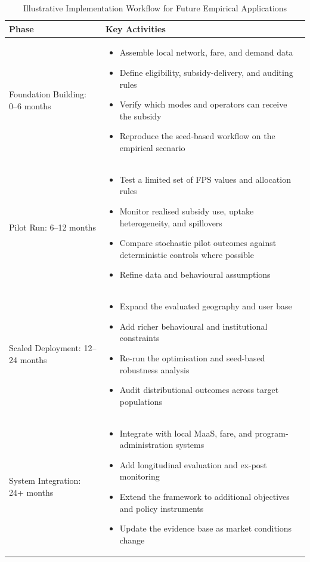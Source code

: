\documentclass[a4paper,fleqn]{cas-sc}
\begin{document}
\begin{table}[htbp]
\centering
\caption{Illustrative Implementation Workflow for Future Empirical Applications}
\label{tab:implementation_framework}
\begin{tabular}{p{2.5cm}p{12cm}}
\toprule
\textbf{Phase} & \textbf{Key Activities} \\
\midrule
Foundation Building: 0--6 months & 
\begin{itemize}
    \item Assemble local network, fare, and demand data
    \item Define eligibility, subsidy-delivery, and auditing rules
    \item Verify which modes and operators can receive the subsidy
    \item Reproduce the seed-based workflow on the empirical scenario
\end{itemize} \\
\midrule
Pilot Run: 6--12 months & 
\begin{itemize}
    \item Test a limited set of FPS values and allocation rules
    \item Monitor realised subsidy use, uptake heterogeneity, and spillovers
    \item Compare stochastic pilot outcomes against deterministic controls where possible
    \item Refine data and behavioural assumptions
\end{itemize} \\
\midrule
Scaled Deployment: 12--24 months & 
\begin{itemize}
    \item Expand the evaluated geography and user base
    \item Add richer behavioural and institutional constraints
    \item Re-run the optimisation and seed-based robustness analysis
    \item Audit distributional outcomes across target populations
\end{itemize} \\
\midrule
System Integration: 24+ months & 
\begin{itemize}
    \item Integrate with local MaaS, fare, and program-administration systems
    \item Add longitudinal evaluation and ex-post monitoring
    \item Extend the framework to additional objectives and policy instruments
    \item Update the evidence base as market conditions change
\end{itemize} \\
\bottomrule
\end{tabular}
\end{table}
\end{document}
